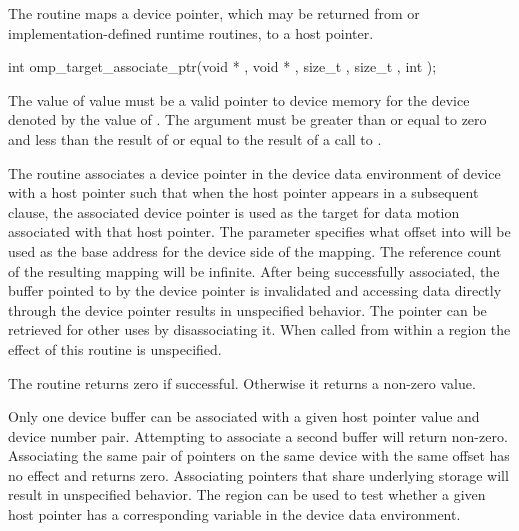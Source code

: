 \begin{ccppspecific}
The  routine maps a device pointer, which may
be returned from  or implementation-defined runtime 
routines, to a host pointer.

\format
\begin{boxedcode}
int omp\_target\_associate\_ptr(void * , void * ,
                             size\_t , size\_t ,
                             int );
\end{boxedcode}

\constraints

The value of  value must be a valid pointer to device 
memory for the device denoted by the value of .
The  argument
must be greater than or equal to zero and less than the result of
 or equal to the result of a call to
.

\pagebreak
{}
\effect

The  routine associates a device pointer
in the device data environment of device 
with a host pointer such that when the host pointer appears in a subsequent
 clause, the associated device pointer is used as the target for
data motion associated with that host pointer.  The 
parameter specifies what offset into  will be used as the
base address for the device side of the mapping.  The reference count of the
resulting mapping will be infinite.  After being successfully associated, the
buffer pointed to by the device pointer is invalidated and accessing data
directly through the device pointer results in unspecified behavior.  The
pointer can be retrieved for other uses by disassociating it.
When called from within a  region 
the effect of this routine is unspecified.

The routine returns zero if successful. Otherwise it returns a non-zero value.

Only one device buffer can be associated with a given host pointer value and
device number pair. Attempting to associate a second buffer will return
non-zero. Associating the same pair of pointers on the same device with the
same offset has no effect and returns zero.  Associating pointers that share
underlying storage will result in unspecified behavior. The
 region can be used to test whether a given
host pointer has a corresponding variable in the device data environment.


\end{ccppspecific}
